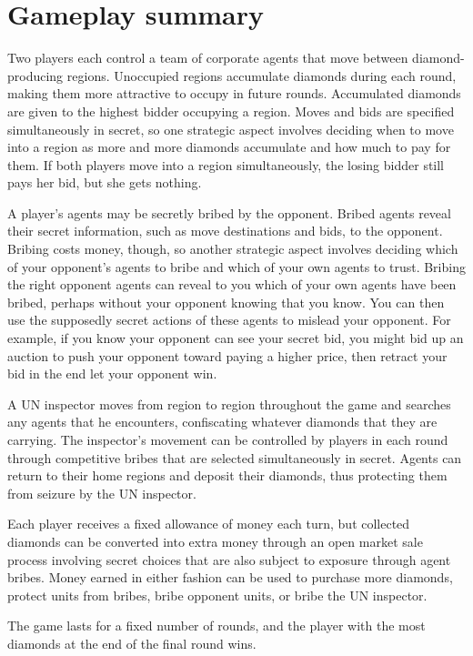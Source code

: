 \documentclass[12pt]{article}
\begin{document}
\section{Gameplay summary}

Two players each control a team of corporate agents that move between diamond-producing regions.  Unoccupied regions accumulate diamonds during each round, making them more attractive to occupy in future rounds.  Accumulated diamonds are given to the highest bidder occupying a region.  Moves and bids are specified simultaneously in secret, so one strategic aspect involves deciding when to move into a region as more and more diamonds accumulate and how much to pay for them.  If both players move into a region simultaneously, the losing bidder still pays her bid, but she gets nothing.

A player's agents may be secretly bribed by the opponent.  Bribed agents reveal their secret information, such as move destinations and bids, to the opponent.  Bribing costs money, though, so another strategic aspect involves deciding which of your opponent's agents to bribe and which of your own agents to trust.  Bribing the right opponent agents can reveal to you which of your own agents have been bribed, perhaps without your opponent knowing that you know.  You can then use the supposedly secret actions of these agents to mislead your opponent.  For example, if you know your opponent can see your secret bid, you might bid up an auction to push your opponent toward paying a higher price, then retract your bid in the end let your opponent win.

A UN inspector moves from region to region throughout the game and searches any agents that he encounters, confiscating whatever diamonds that they are carrying.  The inspector's movement can be controlled by players in each round through competitive bribes that are selected simultaneously in secret.  Agents can return to their home regions and deposit their diamonds, thus protecting them from seizure by the UN inspector.

Each player receives a fixed allowance of money each turn, but collected diamonds can be converted into extra money through an open market sale process involving secret choices that are also subject to exposure through agent bribes.  Money earned in either fashion can be used to purchase more diamonds, protect units from bribes, bribe opponent units, or bribe the UN inspector.  

The game lasts for a fixed number of rounds, and the player with the most diamonds at the end of the final round wins.
\end{document}
